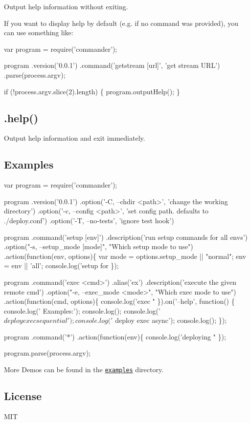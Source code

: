 Output help information without exiting.

If you want to display help by default (e.\+g. if no command was provided), you can use something like\+:


\begin{DoxyCode}
var program = require('commander');

program
  .version('0.0.1')
  .command('getstream [url]', 'get stream URL')
  .parse(process.argv);

  if (!process.argv.slice(2).length) \{
    program.outputHelp();
  \}
\end{DoxyCode}


\subsection*{.help()}

Output help information and exit immediately.

\subsection*{Examples}


\begin{DoxyCode}
var program = require('commander');

program
  .version('0.0.1')
  .option('-C, --chdir <path>', 'change the working directory')
  .option('-c, --config <path>', 'set config path. defaults to ./deploy.conf')
  .option('-T, --no-tests', 'ignore test hook')

program
  .command('setup [env]')
  .description('run setup commands for all envs')
  .option("-s, --setup\_mode [mode]", "Which setup mode to use")
  .action(function(env, options)\{
    var mode = options.setup\_mode || "normal";
    env = env || 'all';
    console.log('setup for %
  \});

program
  .command('exec <cmd>')
  .alias('ex')
  .description('execute the given remote cmd')
  .option("-e, --exec\_mode <mode>", "Which exec mode to use")
  .action(function(cmd, options)\{
    console.log('exec "%
  \}).on('--help', function() \{
    console.log('  Examples:');
    console.log();
    console.log('    $ deploy exec sequential');
    console.log('    $ deploy exec async');
    console.log();
  \});

program
  .command('*')
  .action(function(env)\{
    console.log('deploying "%
  \});

program.parse(process.argv);
\end{DoxyCode}


More Demos can be found in the \href{https://github.com/tj/commander.js/tree/master/examples}{\tt examples} directory.

\subsection*{License}

M\+IT 